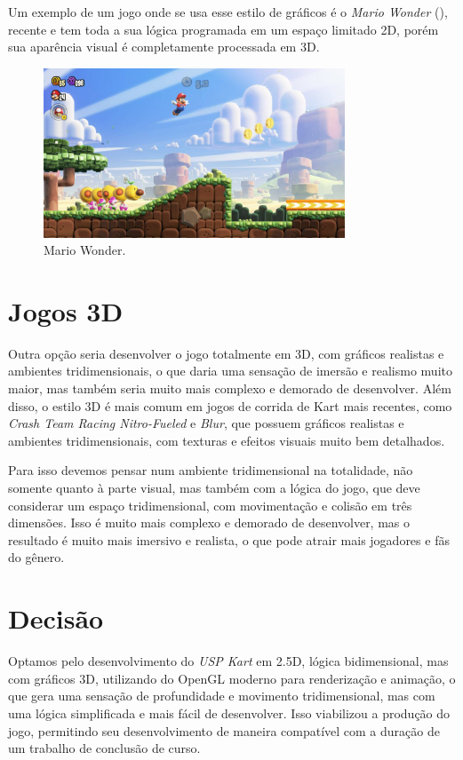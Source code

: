 Um exemplo de um jogo onde se usa esse estilo de gráficos é o \textit{Mario Wonder} (\cite{marioWonder}), recente e tem toda a sua lógica programada em um espaço limitado 2D, porém sua aparência visual é completamente processada em 3D.

\begin{figure}[H]
    \centering
    \includegraphics[width=0.8\textwidth]{figuras/Mario Wonder.jpg}
    \caption{Mario Wonder. \cite{marioWonder}}
    \label{fig:mario-wonder}
\end{figure}

\section{Jogos 3D}

Outra opção seria desenvolver o jogo totalmente em 3D, com gráficos realistas e ambientes tridimensionais, o que daria uma sensação de imersão e realismo muito maior, mas também seria muito mais complexo e demorado de desenvolver. Além disso, o estilo 3D é mais comum em jogos de corrida de Kart mais recentes, como \textit{Crash Team Racing Nitro-Fueled} e \textit{Blur}, que possuem gráficos realistas e ambientes tridimensionais, com texturas e efeitos visuais muito bem detalhados.

Para isso devemos pensar num ambiente tridimensional na totalidade, não somente quanto à parte visual, mas também com a lógica do jogo, que deve considerar um espaço tridimensional, com movimentação e colisão em três dimensões. Isso é muito mais complexo e demorado de desenvolver, mas o resultado é muito mais imersivo e realista, o que pode atrair mais jogadores e fãs do gênero.

\section{Decisão}

Optamos pelo desenvolvimento do \textit{USP Kart} em 2.5D, lógica bidimensional, mas com gráficos 3D, utilizando do OpenGL moderno para renderização e animação, o que gera uma sensação de profundidade e movimento tridimensional, mas com uma lógica simplificada e mais fácil de desenvolver. Isso viabilizou a produção do jogo, permitindo seu desenvolvimento de maneira compatível com a duração de um trabalho de conclusão de curso.